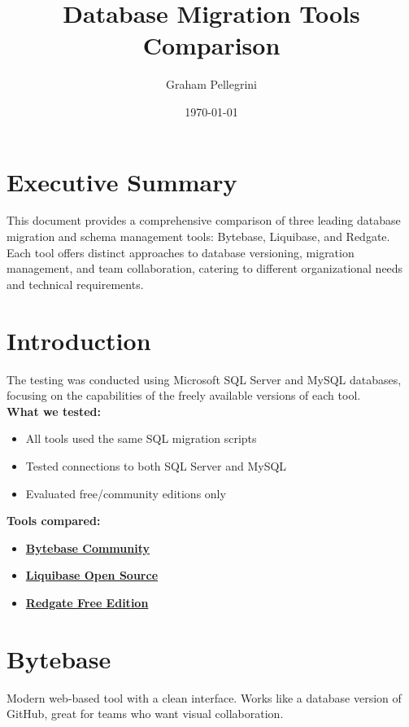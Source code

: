 \documentclass[11pt,a4paper]{article}
\title{Database Migration Tools Comparison}
\author{Graham Pellegrini}
\date{\today}
\begin{document}
\maketitle

\tableofcontents
\newpage

\section{Executive Summary}

This document provides a comprehensive comparison of three leading database migration and schema management tools: Bytebase, Liquibase, and Redgate.
Each tool offers distinct approaches to database versioning, migration management, and team collaboration, catering to different organizational needs and technical requirements.

\section{Introduction}
The testing was conducted using Microsoft SQL Server and MySQL databases, focusing on the  capabilities of the freely available versions of each tool.\\
\textbf{What we tested:}
\begin{itemize}
    \item All tools used the same SQL migration scripts
    \item Tested connections to both SQL Server and MySQL
    \item Evaluated free/community editions only
\end{itemize}

\textbf{Tools compared:}
\begin{itemize}
    \item \href{https://bytebase.com}{\textbf{Bytebase Community}}
    \item \href{https://liquibase.org}{\textbf{Liquibase Open Source}}
    \item \href{https://www.red-gate.com/products/sql-development/sql-compare/}{\textbf{Redgate Free Edition}}
\end{itemize}

\newpage


\section{Bytebase}

Modern web-based tool with a clean interface.
Works like a database version of GitHub, great for teams who want visual collaboration.
\end{document}
